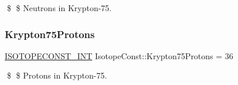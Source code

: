 \$ \$ Neutrons in Krypton-\/75. \mbox{\label{group___isotope_const-_krypton-_kr75_ga2b3321a279ae7b31506ace833fa28a56}} 
\subsubsection{\texorpdfstring{Krypton75\+Protons}{Krypton75Protons}}
{\footnotesize\ttfamily \mbox{\hyperlink{group___isotope_const-_macros_ga5f18360b3e99483a35c32d789e62621c}{I\+S\+O\+T\+O\+P\+E\+C\+O\+N\+S\+T\+\_\+\+I\+NT}} Isotope\+Const\+::\+Krypton75\+Protons = 36}

\$ \$ Protons in Krypton-\/75. 